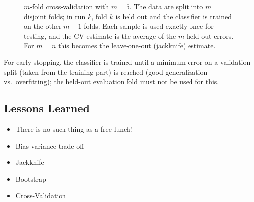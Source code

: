   \begin{figure}[htbp]
    \centering
    \caption{$m$-fold cross-validation with $m=5$. The data are split into $m$ disjoint folds; in run $k$, fold $k$ is held out and the classifier is trained on the other $m-1$ folds. Each sample is used exactly once for testing, and the CV estimate is the average of the $m$ held-out errors. For $m=n$ this becomes the leave-one-out (jackknife) estimate.}
    \label{fig:crossvalidation}
  \end{figure}

  For early stopping, the classifier is trained until a minimum error on a validation split (taken from the training part) is reached (good generalization vs.\ overfitting); the held-out evaluation fold must not be used for this.
   
\subsection{Lessons Learned}

  \begin{itemize}
    \item There is no such thing as a free lunch!              
    \item Bias-variance trade-off              
    \item Jackknife              
    \item Bootstrap              
    \item Cross-Validation
  \end{itemize}


